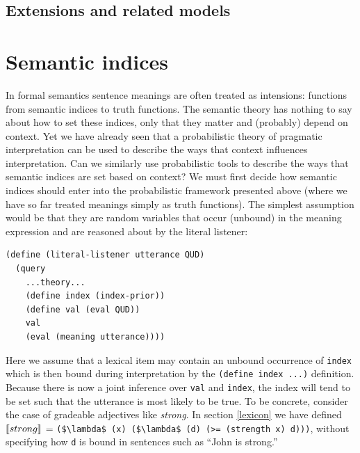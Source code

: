 \documentclass[12pt]{article}
\newcommand{\llbracket}{\ensuremath{\left [\!\left [}}%
\newcommand{\rrbracket}{\ensuremath{\right ]\!\right ]}}
\providecommand{\sv}[1]{\ensuremath{\llbracket #1 \rrbracket}}
\begin{document}
\subsection{Extensions and related models}




\section{Semantic indices}

In formal semantics \cite{montague} sentence meanings are often treated as intensions: functions from semantic indices to truth functions. The semantic theory has nothing to say about how to set these indices, only that they matter and (probably) depend on context. Yet we have already seen that a probabilistic theory of pragmatic interpretation can be used to describe the ways that context influences interpretation. Can we similarly use probabilistic tools to describe the ways that semantic indices are set based on context?
We must first decide how semantic indices should enter into the probabilistic framework presented above (where we have so far treated meanings simply as truth functions). The simplest assumption would be that they are random variables that occur (unbound) in the meaning expression and are reasoned about by the literal listener:
\begin{lstlisting}
(define (literal-listener utterance QUD)
  (query
    ...theory...
    (define index (index-prior))
    (define val (eval QUD))
    val
    (eval (meaning utterance))))
\end{lstlisting}
Here we assume that a lexical item may contain an unbound occurrence of \lstinline{index} which is then bound during interpretation by  the \lstinline{(define index ...)} definition.
Because there is now a joint inference over \lstinline{val} and \lstinline{index}, the index will tend to be set such that the utterance is most likely to be true. 
To be concrete, consider the case of gradeable adjectives like \emph{strong}. In section \ref{lexicon} we have defined \sv{strong} = \lstinline[mathescape]{($\lambda$ (x) ($\lambda$ (d) (>= (strength x) d)))}, without specifying how \lstinline{d} is bound in sentences such as ``John is strong.'' 
\end{document}

